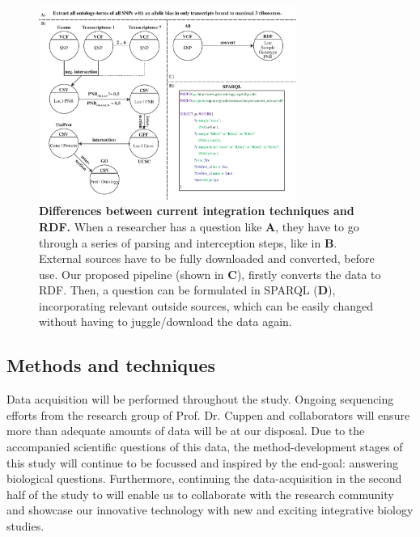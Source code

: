 \documentclass[twoside,fontsize=10pt]{article}
\begin{document}
\begin{figure}[H]
    \centering
    \includegraphics[width=0.75\textwidth]{DifferencesInDoingThings}
    \caption{\textbf{Differences between current integration techniques and RDF.} When a researcher has a question like \textbf{A}, they have to go through a series of parsing and interception steps, like in \textbf{B}. External sources have to be fully downloaded and converted, before use. Our proposed pipeline (shown in \textbf{C}), firstly converts the data to RDF. Then, a question can be formulated in SPARQL (\textbf{D}), incorporating relevant outside sources, which can be easily changed without having to juggle/download the data again.}
    \label{fig:awesome_image}
\end{figure}
\subsection*{Methods and techniques} %
Data acquisition will be performed throughout the study. Ongoing sequencing efforts from the research group of Prof. Dr. Cuppen and collaborators will ensure more than adequate amounts of data will be at our disposal. Due to the accompanied scientific questions of this data, the method-development stages of this study will continue to be focussed and inspired by the end-goal: answering biological questions. Furthermore, continuing the data-acquisition in the second half of the study to will enable us to collaborate with the research community and showcase our innovative technology with new and exciting integrative biology studies.
\medskip
\end{document}
